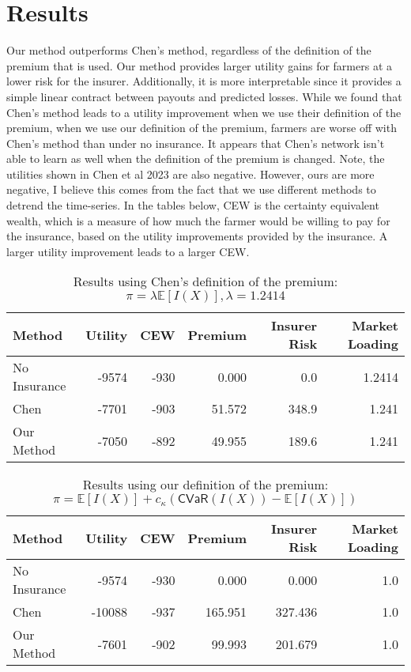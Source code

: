 \documentclass[11pt]{article}
\begin{document}
\section{Results}
  Our method outperforms Chen's method, regardless of the definition of the premium that is used. Our method provides larger utility gains for farmers at a lower risk for the insurer. Additionally, it is more interpretable since it provides a simple linear contract between payouts and predicted losses. While we found that Chen's method leads to a utility improvement when we use their definition of the premium, when we use our definition of the premium, farmers are worse off with Chen's method than under no insurance. It appears that Chen's network isn't able to learn as well when the definition of the premium is changed. Note, the utilities shown in Chen et al 2023 are also negative. However, ours are more negative, I believe this comes from the fact that we use different methods to detrend the time-series. In the tables below, CEW is the certainty equivalent wealth, which is a measure of how much the farmer would be willing to pay for the insurance, based on the utility improvements provided by the insurance. A larger utility improvement leads to a larger CEW. 
  \begin{table}[h!]
    \centering
    \begin{tabular}{lrrrrr}
        \toprule
                    Method &   Utility &      CEW &  Premium &  Insurer Risk &  Market Loading \\
        \midrule
              No Insurance & -9574 & -930 &    0.000 &           0.0 &             1.2414 \\
                     Chen  & -7701 & -903 &   51.572 &         348.9 &           1.241 \\
                Our Method & -7050 & -892 &   49.955 &         189.6 &           1.241 \\
        \bottomrule
        \end{tabular}
        \caption{Results using Chen's definition of the premium: $\pi = \lambda\mathbb{E}[I(X)], \lambda = 1.2414$}
  \end{table}

  \begin{table}[h!]
    \centering
    \begin{tabular}{lrrrrr}
        \toprule
                  Method &    Utility &      CEW &  Premium &  Insurer Risk &  Market Loading \\
        \midrule
         No Insurance &  -9574 & -930 &    0.000 &         0.000 &             1.0 \\
        Chen         & -10088 & -937 &  165.951 &       327.436 &             1.0 \\
        Our Method &  -7601 & -902 &   99.993 &       201.679 &             1.0 \\
        \bottomrule
        \end{tabular}
        \caption{Results using our definition of the premium: $\pi = \mathbb{E}[I(X)] + c_{\kappa}(\textsf{CVaR}(I(X)) -\mathbb{E}[I(X)])$}

  \end{table}
\end{document}
